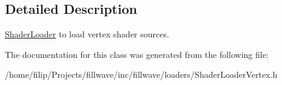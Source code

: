 \subsection{Detailed Description}
\hyperlink{classfillwave_1_1loader_1_1ShaderLoader}{Shader\+Loader} to load vertex shader sources. 

The documentation for this class was generated from the following file\+:\begin{DoxyCompactItemize}
\item 
/home/filip/\+Projects/fillwave/inc/fillwave/loaders/Shader\+Loader\+Vertex.\+h\end{DoxyCompactItemize}
